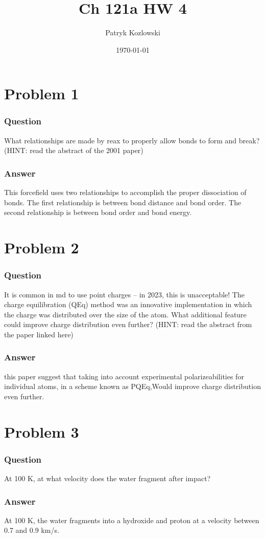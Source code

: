 \documentclass[12pt]{article}
\title{Ch 121a HW 4}
\author{Patryk Kozlowski}
\date{\today}
\begin{document}
\maketitle
\section{Problem 1}
\subsubsection{Question}
 What relationships are made by reax to properly allow bonds to form and break? (HINT: read the abstract of the 2001 paper)
\subsubsection{Answer}
This forcefield uses two relationships to accomplish the proper dissociation of bonds. The first relationship is between bond distance and bond order. The second relationship is between bond order and bond energy.
\cite{van2001reaxff}
\section{Problem 2}
\subsubsection{Question}
It is common in md to use point charges – in 2023, this is unacceptable! The charge equilibration (QEq) method was an innovative implementation in which the charge was distributed over the size of the atom. What additional feature could improve charge distribution even further? (HINT: read the abstract from the paper linked here)
\subsubsection{Answer}
 this paper suggest that taking into account experimental polarizeabilities for individual atoms, in a scheme known as PQEq,Would improve charge distribution even further.
\cite{naserifar2017polarizable}
\section{Problem 3}
\subsubsection{Question}
At 100 K, at what velocity does the water fragment after impact?
\subsubsection{Answer}
At 100 K, the water fragments into a hydroxide and proton at a velocity between 0.7 and 0.9 km/s.
\end{document}
